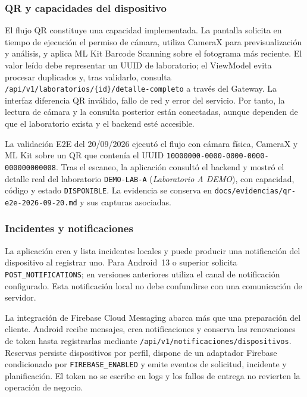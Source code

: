 \subsubsection{QR y capacidades del dispositivo}

El flujo QR constituye una capacidad implementada. La pantalla solicita en
tiempo de ejecución el permiso de cámara, utiliza CameraX para previsualización y
análisis, y aplica ML Kit Barcode Scanning sobre el fotograma más reciente. El
valor leído debe representar un UUID de laboratorio; el ViewModel evita procesar
duplicados y, tras validarlo, consulta
\texttt{/api/v1/laboratorios/\{id\}/detalle-completo} a través del Gateway. La
interfaz diferencia QR inválido, fallo de red y error del servicio. Por tanto,
la lectura de cámara y la consulta posterior están conectadas, aunque dependen de
que el laboratorio exista y el backend esté accesible.

La validación E2E del 20/09/2026 ejecutó el flujo con cámara física, CameraX y
ML Kit sobre un QR que contenía el UUID
\texttt{10000000-0000-0000-0000-000000000008}. Tras el escaneo, la aplicación
consultó el backend y mostró el detalle real del laboratorio
\texttt{DEMO-LAB-A} (\emph{Laboratorio A DEMO}), con capacidad, código y estado
\texttt{DISPONIBLE}. La evidencia se conserva en
\texttt{docs/evidencias/qr-e2e-2026-09-20.md} y sus capturas asociadas.

\subsubsection{Incidentes y notificaciones}

La aplicación crea y lista incidentes locales y puede producir una notificación
del dispositivo al registrar uno. Para Android~13 o superior solicita
\texttt{POST\_NOTIFICATIONS}; en versiones anteriores utiliza el canal de
notificación configurado. Esta notificación local no debe confundirse con una
comunicación de servidor.

La integración de Firebase Cloud Messaging abarca más que una preparación del
cliente. Android recibe mensajes, crea notificaciones y conserva las
renovaciones de token hasta registrarlas mediante
\texttt{/api/v1/notificaciones/dispositivos}. Reservas persiste dispositivos por
perfil, dispone de un adaptador Firebase condicionado por
\texttt{FIREBASE\_ENABLED} y emite eventos de solicitud, incidente y
planificación. El token no se escribe en logs y los fallos de entrega no revierten
la operación de negocio.

